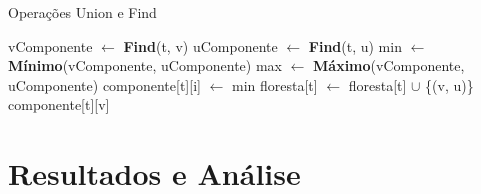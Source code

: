 \documentclass[12pt]{article}
\begin{document}
\begin{algorithm}[h]
    \DontPrintSemicolon
    \caption{Operações Union e Find}
    {
        vComponente $\gets$ \textbf{Find}(t, v)\;
        uComponente $\gets$ \textbf{Find}(t, u)\;
        min $\gets$ \textbf{Mínimo}(vComponente, uComponente)\;
		max $\gets$ \textbf{Máximo}(vComponente, uComponente)\;
        {
            {
                {
                    componente[t][i] $\gets$ min\;
                }
            }
            floresta[t] $\gets$ floresta[t] $\cup$ \{(v, u)\}\;
        }
    }
    {
        \Return componente[t][v]\;
    }
\end{algorithm}

\section{Resultados e Análise}

{\color{gray}\lipsum[1]}
\end{document}
